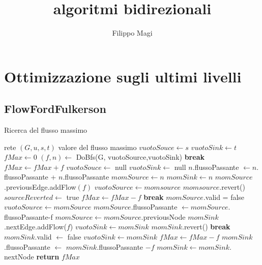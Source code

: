\documentclass{article}
\title{algoritmi bidirezionali}
\author{Filippo Magi }
\begin{document}
\maketitle
\section{Ottimizzazione sugli ultimi livelli}
\subsection{FlowFordFulkerson}
\begin{algorithm}
\caption{Ricerca del flusso massimo}
\begin{algorithmic}[1]
\REQUIRE rete $(G,u,s,t)$
\ENSURE valore del flusso massimo
\STATE $vuotoSouce \leftarrow s $
\STATE $vuotoSink \leftarrow t$
\STATE $fMax \leftarrow 0$
\STATE $(f,n) \leftarrow$ DoBfs(G, vuotoSource,vuotoSink)
\STATE \textbf{break}
\ENDIF
\STATE $fMax \leftarrow fMax + f$
\STATE $vuotoSouce \leftarrow$ null
\STATE $vuotoSink \leftarrow$ null
\STATE $n$.flussoPassante $\leftarrow n.$flussoPassante + $n$.flussoPassante
\STATE $momSource \leftarrow n$
\STATE $momSink \leftarrow n$
\STATE $momSource$.previousEdge.addFlow$(f)$
\STATE $vuotoSource \leftarrow momsource$
\STATE $momsource$.revert() 
\STATE $sourceReverted \leftarrow$ true 
\STATE $fMax \leftarrow fMax - f$
\STATE \textbf{break}
\ELSE
{}
\STATE $momSource$.valid = false
\STATE $vuotoSource \leftarrow momSource$
\ENDIF
\STATE $momSource.$flussoPassante $\leftarrow momSource.$flussoPassante-f
\STATE $momSource \leftarrow momSource.$previousNode
\ENDIF
\ENDWHILE
{}
\STATE $momSink$.nextEdge.addFlow($f$)
\STATE $vuotoSink \leftarrow momSink$
\STATE $momSink$.revert()
\STATE \textbf{break}
\ELSE
{}
\STATE $momSink.$valid $\leftarrow$ false
\STATE $vuotoSink \leftarrow momSink$
\STATE $fMax \leftarrow fMax - f$
\ENDIF
\STATE $momSink$.flussoPassante $\leftarrow$ $momSink$.flussoPassante $-f$
\STATE $momSink \leftarrow momSink.$nextNode
\ENDIF
\ENDWHILE
\ENDIF
\ENDWHILE
\STATE \textbf{return} $fMax$
\end{algorithmic}
\end{algorithm}
\end{document}

